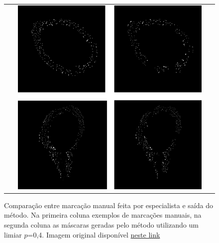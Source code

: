 \begin{figure}[H]
    \center
    \begin{tabular}{@{}c@{}}
        \includegraphics[width=0.9\textwidth]{figures/4_results/figure-manuel-net-results-comparision_lower_res.png}
        \\[\abovecaptionskip]
    \end{tabular}
  
    \caption[Comparação entre marcação manual feita por especialista e saída do método.]{Comparação entre marcação manual feita por especialista e saída do método. Na primeira coluna exemplos de marcações manuais, na segunda coluna as máscaras geradas pelo método utilizando um limiar $p$=0,4. Imagem original disponível \href{https://github.com/igorgonribs/dissertacao/blob/master/figures/4_results/figure-manuel-net-results-comparision.png}{neste link}}
    \label{fig:marcacoes-final}
\end{figure}


